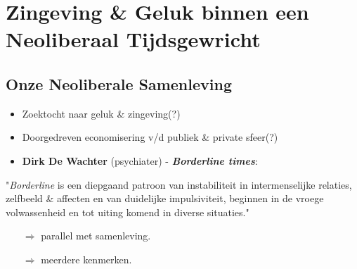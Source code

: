 \section{Zingeving \& Geluk binnen een Neoliberaal Tijdsgewricht}

\subsection*{Onze Neoliberale Samenleving}
\begin{itemize}
	\item Zoektocht naar geluk \& zingeving(?)
	\item Doorgedreven economisering v/d publiek \& private sfeer(?)
	\item \textbf{Dirk De Wachter} (psychiater) - \textbf{\textit{Borderline times}}:
\end{itemize}
\begin{center}
	"\textit{Borderline} is een diepgaand patroon van instabiliteit in intermenselijke relaties, zelfbeeld \& affecten en van duidelijke impulsiviteit, beginnen in de vroege volwassenheid en tot uiting komend in diverse situaties."
\end{center}
\begin{itemize}
	\item[$\Rightarrow$] parallel met samenleving.
	\item[$\Rightarrow$] meerdere kenmerken.
\end{itemize}

